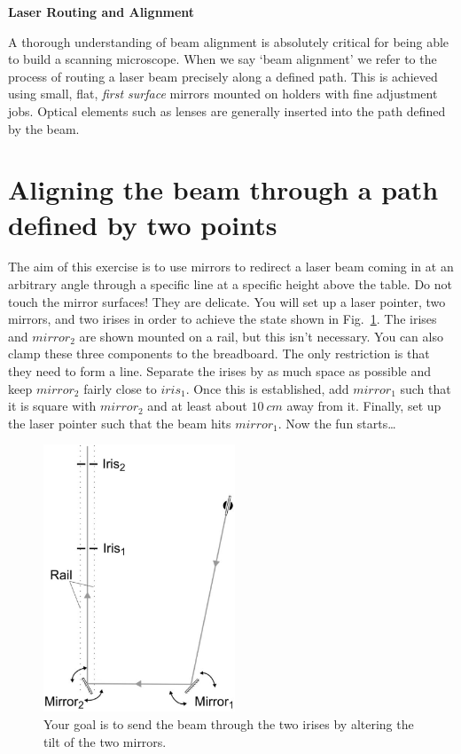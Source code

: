 \documentclass[a4paper]{report}
\begin{document}
\setcounter{secnumdepth}{2}

\begin{center}
\textbf{\Large{Laser Routing and Alignment}}
\end{center}

A thorough understanding of beam alignment is absolutely critical for being able to build a scanning microscope. 
When we say `beam alignment' we refer to the process of routing a laser beam precisely along a defined path. 
This is achieved using small, flat, \textit{first surface} mirrors mounted on holders with fine adjustment jobs.
Optical elements such as lenses are generally inserted into the path defined by the beam. 



\section{Aligning the beam through a path defined by two points}
The aim of this exercise is to use mirrors to redirect a laser beam coming in at an arbitrary angle through a specific line at a specific height above the table.
Do not touch the mirror surfaces! 
They are delicate.
You will set up a laser pointer, two mirrors, and two irises in order to achieve the state shown in Fig.~\ref{fig:ex1}. 
The irises and $mirror_2$ are shown mounted on a rail, but this isn't necessary. 
You can also clamp these three components to the breadboard.
The only restriction is that they need to form a line. 
Separate the irises by as much space as possible and keep $mirror_2$ fairly close to $iris_1$.
Once this is established, add $mirror_1$ such that it is square with $mirror_2$ and at least about $10~cm$ away from it. 
Finally, set up the laser pointer such that the beam hits $mirror_1$.
Now the fun starts\ldots


\begin{figure}[h]
\center
\includegraphics[width=2.25in]{laser_alignment_exercise_basic.eps}
\caption{Your goal is to send the beam through the two irises by altering the tilt of the two mirrors.}
\label{fig:ex1}
\end{figure}
\end{document}
